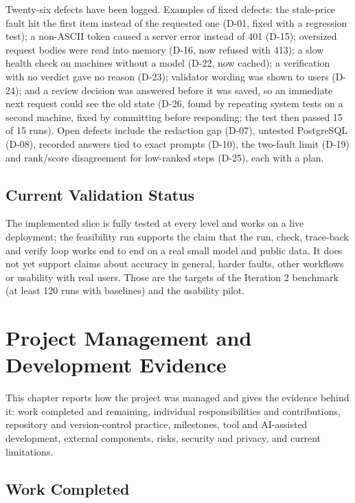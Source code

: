 \documentclass{fast-nuces-bs}
\begin{document}
Twenty-six defects have been logged. Examples of fixed defects: the stale-price fault hit the first item instead of the requested one (D-01, fixed with a regression test); a non-ASCII token caused a server error instead of 401 (D-15); oversized request bodies were read into memory (D-16, now refused with 413); a slow health check on machines without a model (D-22, now cached); a verification with no verdict gave no reason (D-23); validator wording was shown to users (D-24); and a review decision was answered before it was saved, so an immediate next request could see the old state (D-26, found by repeating system tests on a second machine, fixed by committing before responding; the test then passed 15 of 15 runs). Open defects include the redaction gap (D-07), untested PostgreSQL (D-08), recorded answers tied to exact prompts (D-10), the two-fault limit (D-19) and rank/score disagreement for low-ranked steps (D-25), each with a plan.

\section{Current Validation Status}

The implemented slice is fully tested at every level and works on a live deployment; the feasibility run supports the claim that the run, check, trace-back and verify loop works end to end on a real small model and public data. It does not yet support claims about accuracy in general, harder faults, other workflows or usability with real users. Those are the targets of the Iteration 2 benchmark (at least 120 runs with baselines) and the usability pilot.

\chapter{Project Management and Development Evidence}

This chapter reports how the project was managed and gives the evidence behind it: work completed and remaining, individual responsibilities and contributions, repository and version-control practice, milestones, tool and AI-assisted development, external components, risks, security and privacy, and current limitations.

\section{Work Completed}
\end{document}
